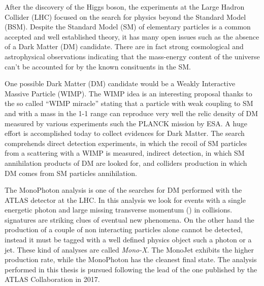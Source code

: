 \documentclass[a4paper,11pt]{article}
\newcommand{\mph}{MonoPhoton }
\begin{document}
After the discovery of the Higgs boson, the experiments at the Large Hadron Collider (LHC) focused on the search for physics beyond the Standard Model (BSM). Despite the Standard Model (SM) of elementary particles is a common accepted and well established theory, it has many open issues such as the absence of a Dark Matter (DM) candidate. There are in fact strong cosmological and astrophysical observations indicating that the mass-energy content of the universe can't be accounted for by the known consituents in the SM.
  
One possible Dark Matter (DM) candidate would be a Weakly Interactive Massive Particle (WIMP). The WIMP idea is an interesting proposal thanks to the so called ``WIMP miracle'' stating that a particle with weak coupling to SM and with a mass in the \SI{1}{\gev}-\SI{1}{\tev} range can reproduce very well the relic density of DM measured by various experiments such the PLANCK mission by ESA. A huge effort is accomplished today to collect evidences for Dark Matter. The search comprehends direct detection experiments, in which the recoil of SM particles from a scattering with a WIMP is measured, indirect detection, in which SM annihilation products of DM are looked for, and colliders production in which DM comes from SM particles annihilation.

The \mph analysis is one of the searches for DM performed with the ATLAS detector at the LHC. In this analysis we look for events with a single energetic photon and large missing transverse momentum (\met) in \pp collisions. \met signatures are striking clues of eventual new phenomena. On the other hand the production of a couple of non interacting particles alone cannot be detected, instead it must be tagged with a well defined physics object such a photon or a jet. These kind of analyses are called \emph{Mono-X}. The MonoJet exhibits the higher production rate, while the \mph has the cleanest final state. The analysis performed in this thesis is pursued following the lead of the one published by the ATLAS Collaboration in 2017.
\end{document}
